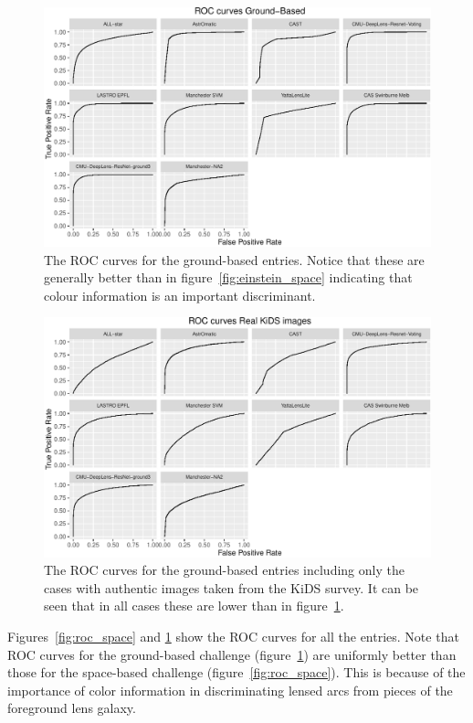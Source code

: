 \documentclass[useAMS,usenatbib]{mnras}
\begin{document}
\begin{figure}
 \includegraphics[width=2\columnwidth]{figures/roc_ground.pdf}
 \caption{The ROC curves for the ground-based entries.  Notice that these are generally better than in figure~\ref{fig:einstein_space} indicating that colour information is an important discriminant. }
 \label{fig:roc_ground}
\end{figure}

\begin{figure}
 \includegraphics[width=2\columnwidth]{figures/roc_kids.pdf}
 \caption{The ROC curves for the ground-based entries including only the cases with authentic images taken from the KiDS survey.  It can be seen that in all cases these are lower than in figure~\ref{fig:roc_ground}.}
 \label{fig:roc_kids}
\end{figure}

Figures~\ref{fig:roc_space} and \ref{fig:roc_ground} show the ROC curves for all the entries.  
Note that ROC curves for the ground-based challenge (figure~\ref{fig:roc_ground}) are uniformly better than those for the space-based challenge (figure~\ref{fig:roc_space}).  This is because of the importance of color information in discriminating lensed arcs from pieces of the foreground lens galaxy.
\end{document}
